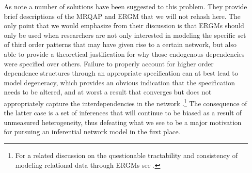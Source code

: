 As \citet{cranmer:etal:2016} note a number of solutions have been suggested to this problem. They provide brief descriptions of the MRQAP and ERGM that we will not rehash here. The only point that we would emphasize from their discussion is that ERGMs should only be used when researchers are not only interested in modeling the specific set of third order patterns that may have given rise to a certain network, but also able to provide a theoretical justification for why those endogenous dependencies were specified over others. Failure to properly account for higher order dependence structures through an appropriate specification can at best lead to model degeneracy, which provides an obvious indication that the specification needs to be altered, and at worst a result that converges but does not appropriately capture the interdependencies in the network \citep{handcock:2003b,hunter:etal:2012}.\footnote{For a related discussion on the questionable tractability and consistency of modeling relational data through ERGMs see \citet{bhamidi:etal:2008,chatterjee:diaconis:2013,chandrasekhar:jackson:2014}.} The consequence of the latter case is a set of inferences that will continue to be biased as a result of unmeasured heterogeneity, thus defeating what we see to be a major motivation for pursuing an inferential network model in the first place. 





